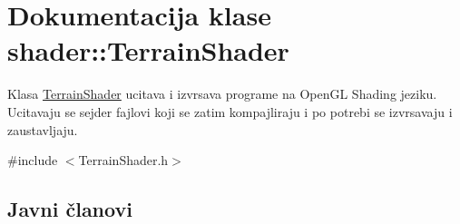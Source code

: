 \hypertarget{classshader_1_1TerrainShader}{}\section{Dokumentacija klase shader\+:\+:Terrain\+Shader}
\label{classshader_1_1TerrainShader}


Klasa \hyperlink{classshader_1_1TerrainShader}{Terrain\+Shader} ucitava i izvrsava programe na Open\+GL Shading jeziku. Ucitavaju se sejder fajlovi koji se zatim kompajliraju i po potrebi se izvrsavaju i zaustavljaju.  




{\ttfamily \#include $<$Terrain\+Shader.\+h$>$}

\subsection*{Javni članovi}
